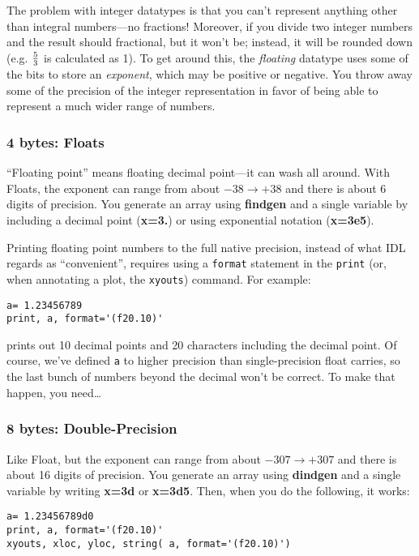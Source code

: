 \documentclass[psfig,preprint]{aastex}
\begin{document}
	The problem with integer datatypes is that you can't represent
anything other than integral numbers---no fractions! Moreover, if you
divide two integer numbers and the result should fractional, but it
won't be; instead, it will be rounded down (e.g.  $5 \over 3$ is
calculated as 1).  To get around this, the {\it floating} datatype uses
some of the bits to store an {\it exponent}, which may be positive or
negative.  You throw away some of the precision of the integer
representation in favor of being able to represent a much wider range of
numbers. 

\subsubsection{4 bytes: Floats}

	``Floating point'' means floating decimal point---it can wash all
around.  With Floats, the exponent can range from about $-38 \rightarrow
+38$ and there is about 6 digits of precision.  You generate an array
using {\bf findgen} and a single variable by including a
decimal point ({\bf x=3.}) or using exponential notation ({\bf x=3e5}).

	Printing floating point numbers to the full native precision,
instead of what IDL regards as ``convenient'', 
requires using a \verb$format$ statement in the \verb$print$ (or, when
annotating a plot, the \verb$xyouts$) command. For example:

\begin{verbatim}
a= 1.23456789
print, a, format='(f20.10)'
\end{verbatim}

\noindent prints out 10 decimal points and 20 characters including the
decimal point.  Of course, we've defined \verb$a$ to higher precision
than single-precision float carries, so the last bunch of numbers beyond
the decimal won't be correct. To make that happen, you need\dots

\subsubsection{8 bytes: Double-Precision}

	Like Float, but the exponent can range from about $-307
\rightarrow +307$ and there is about 16 digits of precision.  You
generate an array using {\bf dindgen} and a single
variable by writing {\bf x=3d} or {\bf x=3d5}. Then, when you do the
following, it works:

\begin{verbatim}
a= 1.23456789d0
print, a, format='(f20.10)'
xyouts, xloc, yloc, string( a, format='(f20.10)')
\end{verbatim}
\end{document}
